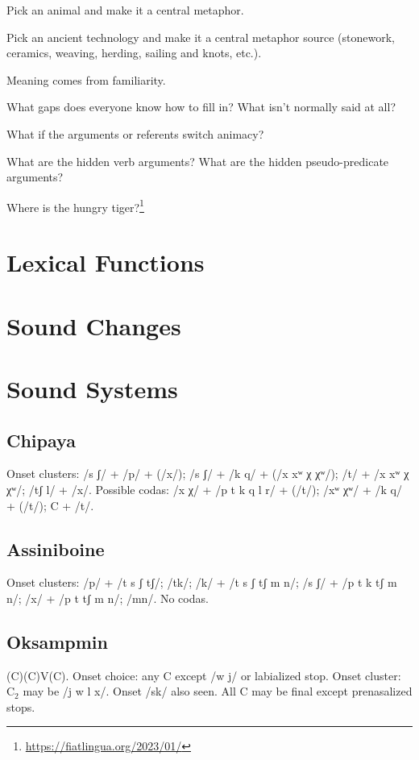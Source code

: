 \documentclass[11pt]{article}
\begin{document}
{Pick an animal and make it a central metaphor.

Pick an ancient technology and make it a central metaphor source
(stonework, ceramics, weaving, herding, sailing and knots, etc.).

Meaning comes from familiarity.

What gaps does everyone know how to fill in?  What isn't normally said
at all?

What if the arguments or referents switch animacy?

What are the hidden verb arguments?  What are the hidden
pseudo-predicate arguments?

Where is the hungry tiger?\footnote{\url{https://fiatlingua.org/2023/01/}}



\section{Lexical Functions}


\section{Sound Changes}
{\small

}

\section{Sound Systems}

\subsection{Chipaya} Onset clusters: /s ʃ/ + /p/ + (/x/); /s ʃ/ + /k q/ +
(/x xʷ χ χʷ/); /t/ + /x xʷ χ χʷ/; /tʃ l/ + /x/.  Possible codas: /x χ/
+ /p t k q l r/ + (/t/); /xʷ χʷ/ + /k q/ + (/t/); C + /t/. 

\subsection{Assiniboine} Onset clusters: /p/ + /t s ʃ tʃ/; /tk/; /k/ +
/t s ʃ tʃ m n/; /s ʃ/ + /p t k tʃ m n/; /x/ + /p t tʃ m n/; /mn/.  No
codas. 

\subsection{Oksampmin} (C)(C)V(C).  Onset choice: any C except /w j/
or labialized stop.  Onset cluster: C$_{2}$ may be /j w l x/.  Onset
/sk/ also seen.  All C may be final except prenasalized stops.

}
\end{document}
